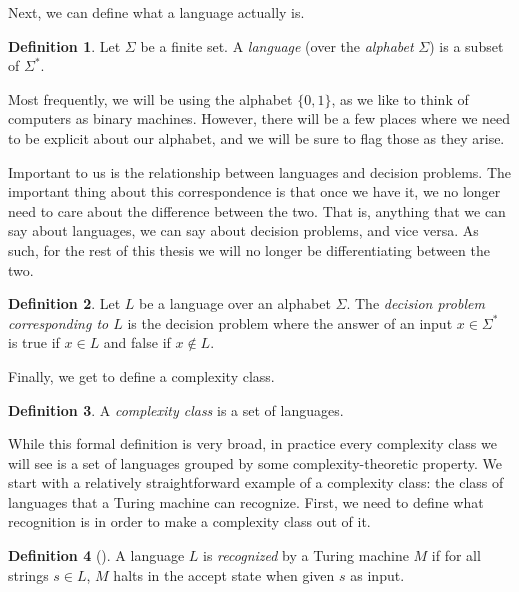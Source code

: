 \documentclass[english,12pt]{reedthesis}
\theoremstyle{plain}
\theoremstyle{definition}
\newtheorem{defn}[defn]{Definition}
\theoremstyle{remark}
\begin{document}
Next, we can define what a language actually is.

\begin{defn}\label{def:language}
  Let $\Sigma$ be a finite set. A \emph{language} (over the \emph{alphabet} $\Sigma$) is a
  subset of $\Sigma^{*}$.
\end{defn}

Most frequently, we will be using the alphabet $\{0, 1\}$, as we like to think
of computers as binary machines. However, there will be a few places where we
need to be explicit about our alphabet, and we will be sure to flag those as
they arise.

Important to us is the relationship between languages and decision problems. The
important thing about this correspondence is that once we have it, we no longer
need to care about the difference between the two. That is, anything that we can
say about languages, we can say about decision problems, and vice versa. As
such, for the rest of this thesis we will no longer be differentiating between
the two.

\begin{defn}
  Let $L$ be a language over an alphabet $\Sigma$. The \emph{decision problem
    corresponding to $L$} is the decision problem where the answer of an input
  $x \in \Sigma^{*}$ is true if $x \in L$ and false if $x \notin L$.
\end{defn}

Finally, we get to define a complexity class.

\begin{defn}
  A \emph{complexity class} is a set of languages.
\end{defn}

While this formal definition is very broad, in practice every complexity class
we will see is a set of languages grouped by some complexity-theoretic property.
We start with a relatively straightforward example of a complexity class: the
class of languages that a Turing machine can recognize. First, we need to
define what recognition is in order to make a complexity class out of it.

\begin{defn}[{\cite[Def.\ 3.2]{Sip97}}]\label{def:recognition}
  A language $L$ is \emph{recognized} by a Turing machine $M$ if for all strings
  $s \in L$, $M$ halts in the accept state when given $s$ as input.
\end{defn}
\end{document}

